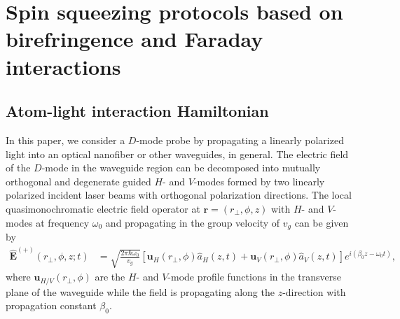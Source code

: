 \documentclass[aps,pra,twocolumn,superscriptaddress]{revtex4-1} %
\def\br{\mathbf{r}}
\begin{document}
\section{Spin squeezing protocols based on birefringence and Faraday interactions} \label{Sec::comparison}
\subsection{Atom-light interaction Hamiltonian}
In this paper, we consider a $ D $-mode probe by propagating a linearly polarized light into an optical nanofiber or other waveguides, in general. 
The electric field of the $ D $-mode in the waveguide region can be decomposed into mutually orthogonal and degenerate guided $ H $- and $ V $-modes formed by two linearly polarized incident laser beams with orthogonal polarization directions. 
The local quasimonochromatic electric field operator at $ \br=(r\!_\perp,\phi,z) $ with $ H $- and $ V $-modes at frequency $\omega_0$ and propagating in the group velocity of $ v_g $ can be given by
\begin{align}\label{eq:Ebp}
\hat{\mathbf{E}}^{(+)}(r\!_\perp,\phi,z;t) &= \sqrt{ \frac{2 \pi \hbar \omega_0}{ v_g} } \left[\mathbf{u}_H(r\!_\perp,\phi) \hat{a}_H(z,t) + \mathbf{u}_V(r\!_\perp,\phi) \hat{a}_V(z,t)\right]  e^{i (\beta_0 z- \omega_0 t)},
\end{align}
where $ \mathbf{u}_{H/V}(r\!_\perp,\phi) $ are the $ H $- and $ V $-mode profile functions in the transverse plane of the waveguide while the field is propagating along the $ z $-direction with propagation constant $ \beta_0 $. 
\end{document}
